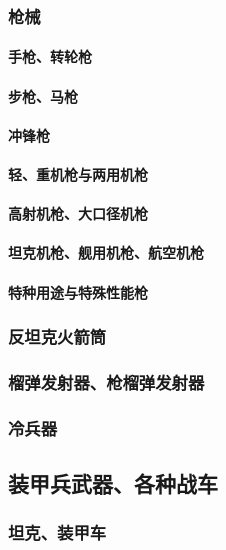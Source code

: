 \documentclass[UTF8]{../ApplicationUniverse}
\begin{document}
        \subsubsection{枪械}
            \paragraph{手枪、转轮枪}
            \paragraph{步枪、马枪}
            \paragraph{冲锋枪}
            \paragraph{轻、重机枪与两用机枪}
            \paragraph{高射机枪、大口径机枪}
            \paragraph{坦克机枪、舰用机枪、航空机枪}
            \paragraph{特种用途与特殊性能枪}
        \subsubsection{反坦克火箭筒}
        \subsubsection{榴弹发射器、枪榴弹发射器}
        \subsubsection{冷兵器}

    \subsection{装甲兵武器、各种战车}
        \subsubsection{坦克、装甲车}
\end{document}
